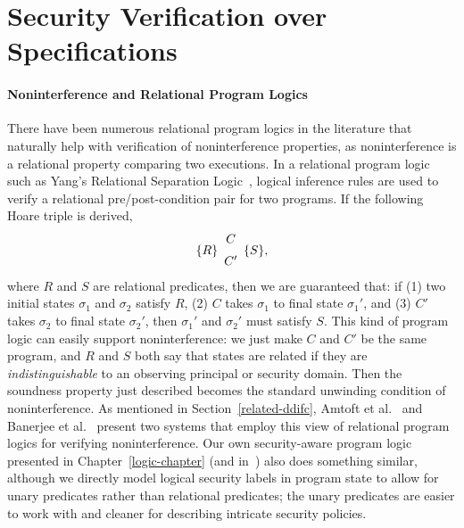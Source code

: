 \section{Security Verification over Specifications}
\label{related-methodology}

\paragraph{Noninterference and Relational Program Logics}
There have been numerous relational program logics in the literature
that naturally help with verification of noninterference properties,
as noninterference is a relational property comparing two executions.
In a relational program logic such as Yang's Relational Separation 
Logic~\cite{yang07}, logical inference rules are used to verify a 
relational pre/post-condition pair for two programs. If the
following Hoare triple is derived,
\[\rassert{R}{C}{C'}{S},\]
where $R$ and $S$ are relational predicates, then we are guaranteed
that: if (1) two initial states $\sigma_1$ and $\sigma_2$ satisfy $R$,
(2) $C$ takes $\sigma_1$ to final state $\sigma_1'$, and (3) $C'$ takes
$\sigma_2$ to final state $\sigma_2'$, then $\sigma_1'$ and $\sigma_2'$
must satisfy $S$. This kind of program logic can easily support
noninterference: we just make $C$ and $C'$ be the same program,
and $R$ and $S$ both say that states are related if they are 
\emph{indistinguishable} to an observing principal or security domain.
Then the soundness property just described becomes the standard
unwinding condition of noninterference. As mentioned in 
Section~\ref{related-ddifc}, Amtoft et al.~\cite{amtoft06} and
Banerjee et al.~\cite{banerjee08} present two systems that employ 
this view of relational program logics for verifying noninterference.
Our own security-aware program logic presented in Chapter~\ref{logic-chapter}
(and in~\cite{costanzo-ddifc}) also does something similar, although 
we directly model logical security labels in program state to allow for unary 
predicates rather than relational predicates; the unary predicates are easier 
to work with and cleaner for describing intricate security policies.


